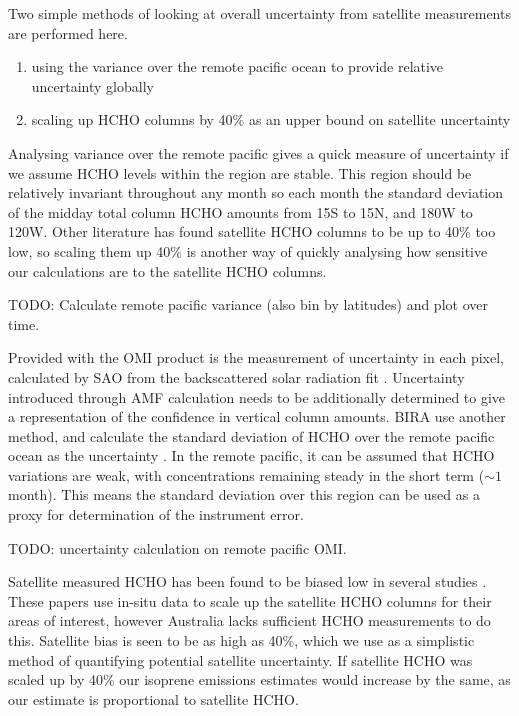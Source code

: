     
    Two simple methods of looking at overall uncertainty from satellite measurements are performed here.
    \begin{enumerate}
      \item using the variance over the remote pacific ocean to provide relative uncertainty globally \parencite[e.g.][]{DeSmedt2012}
      \item scaling up HCHO columns by 40\% as an upper bound on satellite uncertainty
    \end{enumerate}
    Analysing variance over the remote pacific gives a quick measure of uncertainty if we assume HCHO levels within the region are stable.
    This region should be relatively invariant throughout any month so each month the standard deviation of the midday total column HCHO amounts from 15\degr S to 15\degr N, and 180\degr W to 120\degr W.
    Other literature has found satellite HCHO columns to be up to 40\% too low, so scaling them up 40\% is another way of quickly analysing how sensitive our calculations are to the satellite HCHO columns.
    
    TODO: Calculate remote pacific variance (also bin by latitudes) and plot over time. 
    
    
    Provided with the OMI product is the measurement of uncertainty in each pixel, calculated by SAO from the backscattered solar radiation fit \parencite{Abad2015,Abad2016}.
    Uncertainty introduced through AMF calculation needs to be additionally determined to give a representation of the confidence in vertical column amounts.
    BIRA use another method, and calculate the standard deviation of HCHO over the remote pacific ocean as the uncertainty \parencite{DeSmedt2012, DeSmedt2015}.
    In the remote pacific, it can be assumed that HCHO variations are weak, with concentrations remaining steady in the short term ($\sim 1$ month).
    This means the standard deviation over this region can be used as a proxy for determination of the instrument error.
    
    
    TODO: uncertainty calculation on remote pacific OMI.
    
    Satellite measured HCHO has been found to be biased low in several studies \parencite[eg.][]{Zhu2016,DeSmedt2015,Barkley2013}.
    These papers use in-situ data to scale up the satellite HCHO columns for their areas of interest, however Australia lacks sufficient HCHO measurements to do this.
    Satellite bias is seen to be as high as 40\%, which we use as a simplistic method of quantifying potential satellite uncertainty.
    If satellite HCHO was scaled up by 40\% our isoprene emissions estimates would increase by the same, as our estimate is proportional to satellite HCHO.
    
